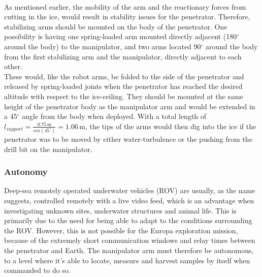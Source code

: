 \\
As mentioned earlier, the mobility of the arm and the reactionary forces from cutting in the ice, would result in stability issues for the penetrator. Therefore, stabilizing arms should be mounted on the body of the penetrator. One possibility is having one spring-loaded arm mounted directly adjacent (180$^\circ$ around the body) to the manipulator, and two arms located 90$^\circ$ around the body from the first stabilizing arm and the manipulator, directly adjacent to each other.\\
These would, like the robot arms, be folded to the side of the penetrator and released by spring-loaded joints when the penetrator has reached the desired altitude with respect to the ice-ceiling. They should be mounted at the same height of the penetrator body as the manipulator arm and would be extended in a 45$^\circ$ angle from the body when deployed. With a total length of $l_{support}=\frac{0.75\,\mathrm{m}}{cos(45^\circ)}=1.06\,\mathrm{m}$, the tips of the arms would then dig into the ice if the penetrator was to be moved by either water-turbulence or the pushing from the drill bit on the manipulator.


\subsubsection{Autonomy}
Deep-sea remotely operated underwater vehicles (ROV) are usually, as the name suggests, controlled remotely with a live video feed, which is an advantage when investigating unknown sites, underwater structures and animal life. This is primarily due to the need for being able to adapt to the conditions surrounding the ROV. However, this is not possible for the Europa exploration mission, because of the extremely short communication windows and relay times between the penetrator and Earth. The manipulator arm must therefore be autonomous, to a level where it's able to locate, measure and harvest samples by itself when commanded to do so. 


